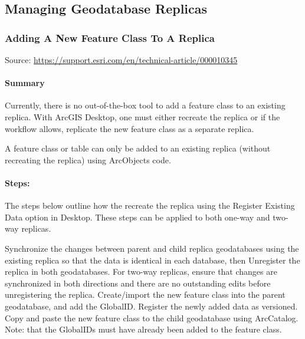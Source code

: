 \documentclass[class=article , crop=false, titlepage, twoside, multi={itemize, figure, verbatim}, float=false]{standalone}
\title{}  %
\begin{document}


\ifstandalone
\maketitle %
\tableofcontents %
\clearpage
\fi

\subsection{Managing Geodatabase Replicas}
\medskip 
\subsubsection[Adding A New Feature Class To A Replica]{\Large Adding A New Feature Class To A Replica}

Source:
\href{https://support.esri.com/en/technical-article/000010345}{https://support.esri.com/en/technical-article/000010345}

\paragraph[Summary]{Summary \texorpdfstring{\\}{}}
Currently, there is no out-of-the-box tool to add a feature class to an existing replica. With ArcGIS Desktop, one must either recreate the replica or if the workflow allows, replicate the new feature class as a separate replica.

A feature class or table can only be added to an existing replica (without recreating the replica) using ArcObjects code.

\paragraph[Steps]{Steps:\texorpdfstring{\\}{}}

The steps below outline how the recreate the replica using the Register Existing Data option in Desktop. These steps can be applied to both one-way and two-way replicas.


Synchronize the changes between parent and child replica geodatabases using the existing replica so that the data is identical in each database, then Unregister the replica in both geodatabases. For two-way replicas, ensure that changes are synchronized in both directions and there are no outstanding edits before unregistering the replica.
Create/import the new feature class into the parent geodatabase, and add the GlobalID.
Register the newly added data as versioned.
Copy and paste the new feature class to the child geodatabase using ArcCatalog. 
Note:
 that the GlobalIDs must have already been added to the feature class.
\end{document}

